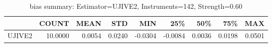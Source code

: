 \begin{table}[ht]
\centering
\caption{bias summary: Estimator=UJIVE2, Instruments=142, Strength=0.60}
\begin{tabular}{lrrrrrrrr}
\toprule
 & COUNT & MEAN & STD & MIN & 25\% & 50\% & 75\% & MAX \\
\midrule
UJIVE2 & 10.0000 & 0.0054 & 0.0240 & -0.0304 & -0.0084 & 0.0036 & 0.0198 & 0.0501 \\
\bottomrule
\end{tabular}
\end{table}
